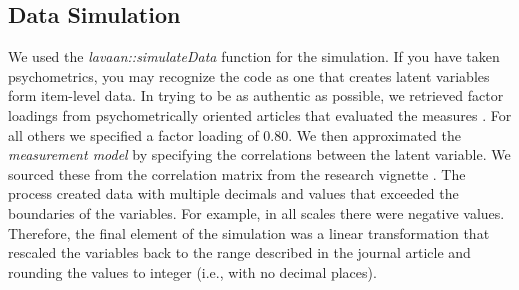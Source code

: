 \documentclass[
  11pt,
]{book}
\begin{document}
\hypertarget{data-simulation}{%
\subsection{Data Simulation}\label{data-simulation}}

We used the \emph{lavaan::simulateData} function for the simulation. If you have taken psychometrics, you may recognize the code as one that creates latent variables form item-level data. In trying to be as authentic as possible, we retrieved factor loadings from psychometrically oriented articles that evaluated the measures \citep{nadal_racial_2011, veit_structure_1983}. For all others we specified a factor loading of 0.80. We then approximated the \emph{measurement model} by specifying the correlations between the latent variable. We sourced these from the correlation matrix from the research vignette \citep{kim_racial_2017}. The process created data with multiple decimals and values that exceeded the boundaries of the variables. For example, in all scales there were negative values. Therefore, the final element of the simulation was a linear transformation that rescaled the variables back to the range described in the journal article and rounding the values to integer (i.e., with no decimal places).
\end{document}
